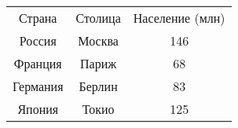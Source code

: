 \documentclass{article}
\begin{document}
\begin{tabular}{|c|c|c|}
\hline
Страна & Столица & Население (млн) \\
Россия & Москва & 146 \\
Франция & Париж & 68 \\
Германия & Берлин & 83 \\
Япония & Токио & 125 \\
\hline
\end{tabular}
\end{document}
